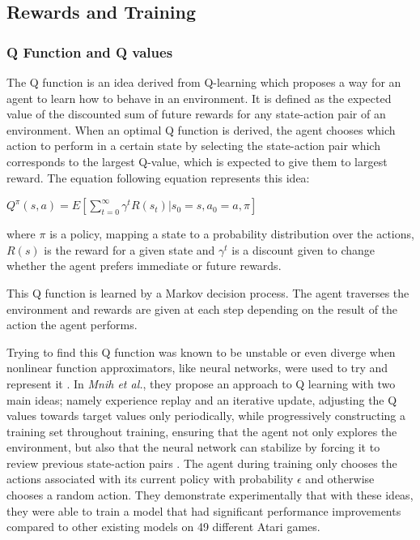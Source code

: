 \documentclass{article}
\begin{document}
\subsection{Rewards and Training}\label{sec:rewards-training-eco}

\subsubsection{Q Function and Q values}\label{sec:q-function}

The Q function is an idea derived from Q-learning \cite{qlearning} which proposes a way for an agent to learn how to behave in an environment. It is defined as the expected value of the discounted sum of future rewards for any state-action pair of an environment. When an optimal Q function is derived, the agent chooses which action to perform in a certain state by selecting the state-action pair which corresponds to the largest Q-value, which is expected to give them to largest reward. The equation following equation represents this idea:
 
$Q^\pi(s, a) = E[\sum_{t=0}^{\infty} \gamma^t R(s_t) | s_0 = s, a_0 = a, \pi]$

where $\pi$ is a policy, mapping a state to a probability distribution over the actions, $R(s)$ is the reward for a given state and $\gamma^t$ is a discount given to change whether the agent prefers immediate or future rewards.

This Q function is learned by a Markov decision process. The agent traverses the environment and rewards are given at each step depending on the result of the action the agent performs.

Trying to find this Q function was known to be unstable or even diverge when nonlinear function approximators, like neural networks, were used to try and represent it \cite{td-func-approx}. In \textit{Mnih et al.}, they propose an approach to Q learning with two main ideas; namely experience replay and an iterative update, adjusting the Q values towards target values only periodically, while progressively constructing a training set throughout training, ensuring that the agent not only explores the environment, but also that the neural network can stabilize by forcing it to review previous state-action pairs \cite{deepmind_2015}. The agent during training only chooses the actions associated with its current policy with probability $\epsilon$ and otherwise chooses a random action. They demonstrate experimentally that with these ideas, they were able to train a model that had significant performance improvements compared to other existing models on 49 different Atari games.
\end{document}
